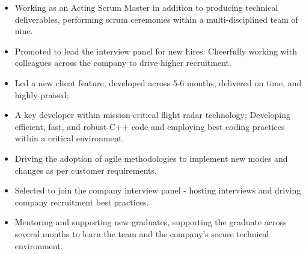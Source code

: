 \documentclass[8pt,a4paper]{altacv}
\begin{document}

\begin{fullwidth}
\makecvheader
\end{fullwidth}

\begin{itemize}

\item Working as an Acting Scrum Master in addition to producing technical deliverables, performing scrum ceremonies within a multi-disciplined team of nine.
\item Promoted to lead the interview panel for new hires: Cheerfully working with colleagues across the company to drive higher recruitment. 
\divider
\end{itemize}

\begin{itemize}

\item Led a new client feature, developed across 5-6 months, delivered on time, and highly praised;
\item A key developer within mission-critical flight radar technology; Developing efficient, fast, and robust C++ code and employing best coding practices within a critical environment. 
\item Driving the adoption of agile methodologies to implement new modes and changes as per customer requirements.
\item Selected to join the company interview panel - hosting interviews and driving company recruitment best practices.
\item Mentoring and supporting new graduates,  supporting the graduate across several months to learn the team and the company's secure technical environment.

\divider
\end{itemize}
\end{document}
